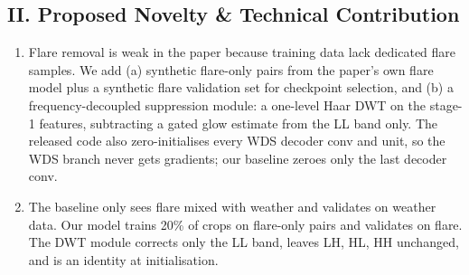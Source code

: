 \documentclass[8pt,a4paper]{article}
\begin{document}
\subsection*{II. Proposed Novelty \& Technical Contribution}
\begin{enumerate}
    \item Flare removal is weak in the paper because training data lack dedicated flare samples. We add (a) synthetic flare-only pairs from the paper's own flare model plus a synthetic flare validation set for checkpoint selection, and (b) a frequency-decoupled suppression module: a one-level Haar DWT on the stage-1 features, subtracting a gated glow estimate from the LL band only. The released code also zero-initialises every WDS decoder conv and unit, so the WDS branch never gets gradients; our baseline zeroes only the last decoder conv.
    \item The baseline only sees flare mixed with weather and validates on weather data. Our model trains 20\% of crops on flare-only pairs and validates on flare. The DWT module corrects only the LL band, leaves LH, HL, HH unchanged, and is an identity at initialisation.
\end{enumerate}

\end{document}
